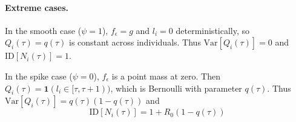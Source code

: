 \paragraph{Extreme cases.}
In the smooth case ($\psi = 1$), $f_\epsilon = g$ and $l_i = 0$ deterministically, so $Q_i(\tau) = q(\tau)$ is constant across individuals. Thus $\text{Var}[Q_i(\tau)] = 0$ and $\text{ID}[N_i(\tau)] = 1$.

In the spike case ($\psi = 0$), $f_\epsilon$ is a point mass at zero. Then $Q_i(\tau) = \mathbf{1}(l_i \in [\tau, \tau+1))$, which is Bernoulli with parameter $q(\tau)$. Thus $\text{Var}[Q_i(\tau)] = q(\tau)(1 - q(\tau))$ and
\begin{equation}
	\text{ID}[N_i(\tau)] = 1 + R_0(1 - q(\tau))
\end{equation}




